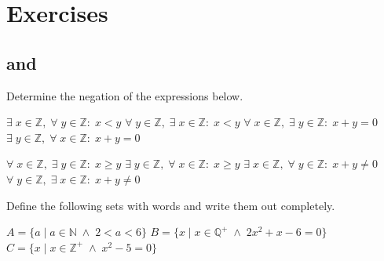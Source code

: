 
\newpage
\ifcourse %


\section{Exercises}

\renewcommand{\ExerciseListName}{Assignment}

 \subsection*{ and }


\ifanalysis\begin{Exercise}[difficulty = 1]\fi
\ifcalculus\begin{Exercise}[difficulty = 2]\fi
Determine the negation of the expressions below.\par 

\begin{multicols}{2}
		\Question $\exists\;x \in \mathbb{Z},\;\forall\;y\in \mathbb{Z}:\;x<y$
		\Question $\forall\;y \in \mathbb{Z},\;\exists\;x\in \mathbb{Z}:\;x<y$
		\Question $\forall\;x \in \mathbb{Z},\;\exists\;y\in \mathbb{Z}:\;x+y=0$
		\Question $\exists\;y \in \mathbb{Z},\;\forall\;x\in \mathbb{Z}:\;x+y=0$
		\EndCurrentQuestion
	\end{multicols}
\ifanalysis\end{Exercise}\fi
\ifcalculus\end{Exercise}\fi
{}
\begin{Answer} \phantom{}
    \begin{multicols}{2}

    	\Question  $\forall \; x \in \mathbb{Z}, \; \exists \; y \in \mathbb{Z}: \; x \geq y $
    	\Question  $\exists\;y \in \mathbb{Z},\;\forall\;x\in \mathbb{Z}:\; x \geq y$
    	\Question  $\exists\;x \in \mathbb{Z},\;\forall\;y\in \mathbb{Z}:\;x+y \neq 0$
    	\Question  $\forall \; y \in \mathbb{Z}, \; \exists\; x \in \mathbb{Z}: \; x+y \neq 0$	
        \EndCurrentQuestion
	\end{multicols}
\end{Answer}

\begin{Exercise}  [difficulty = 1] Define the following sets with words and write them out completely.  
	\begin{multicols}{2}
			\Question $A=\{a\;|\;a\in \mathbb{N} \; \wedge \; 2<a<6 \}$
			\Question $B=\{x\;|\;x\in \mathbb{Q}^+ \; \wedge \; 2x^2 +x-6=0 \}$
			\Question $C=\{x\;|\;x\in \mathbb{Z}^+ \; \wedge \; x^2 -5=0 \}$
			\EndCurrentQuestion
	\end{multicols}
\end{Exercise}

